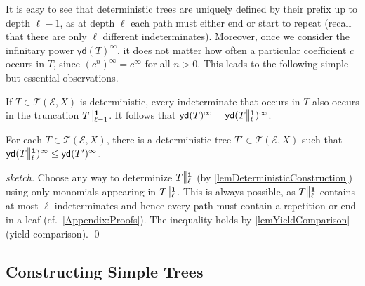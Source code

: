 \documentclass[english,runningheads,a4paper,envcountsame]{llncs}
\newcommand*{\EE}{\mathcal{E}}
\newcommand*{\yield}{\mathsf{yd}}
\newcommand*{\Trees}{\mathcal{T}}
\newcommand{\cut}[2]{\scalebox{1}[1.3]{$\|$}\vphantom{|}_{#1}^{#2}}
\newcommand{\one}{\tup 1}
\newcommand*{\tup}[1]{\mathbf{#1}}
\begin{document}
It is easy to see that deterministic trees are uniquely defined by their prefix up to depth $\ell-1$, as at depth $\ell$ each path must either end or start to repeat (recall that there are only $\ell$ different indeterminates).
Moreover, once we consider the infinitary power $\yield(T)^\infty$, it does not matter how often a particular coefficient $c$ occurs in $T$, since $(c^n)^\infty = c^\infty$ for all $n > 0$.
This leads to the following simple but essential observations.

\begin{lemma}\label{lemDeterministicPrefix}
If $T \in \Trees(\EE,X)$ is deterministic, every indeterminate that occurs in $T$ also occurs in the truncation $T \cut {\ell-1} \one$.
It follows that $\yield(T)^\infty = \yield(T \cut \ell \one)^\infty$.
\end{lemma}

\begin{corollary}\label{lemDeterministicExists}
For each $T \in \Trees(\EE,X)$, there is a deterministic tree $T' \in \Trees(\EE, X)$ such that $\yield(T \cut \ell \one)^\infty \le \yield(T')^\infty$.
\end{corollary}
\begin{proof}[sketch]
Choose any way to determinize $T \cut \ell \one$ (by \cref{lemDeterministicConstruction}) using only monomials appearing in $T \cut \ell \one$.
This is always possible, as $T \cut \ell \one$ contains at most $\ell$ indeterminates and hence every path must contain a repetition or end in a leaf (cf.\ \cref{Appendix:Proofs}).
The inequality holds by \cref{lemYieldComparison} (yield comparison). \qed
\end{proof}


\subsection{Constructing Simple Trees}
\end{document}
